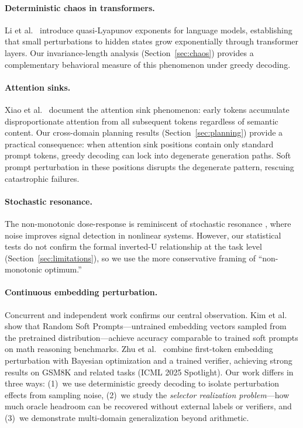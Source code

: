 \documentclass{article}
\begin{document}
\paragraph{Deterministic chaos in transformers.}
Li et al.~\cite{li2025} introduce quasi-Lyapunov exponents for
language models, establishing that small perturbations to hidden states
grow exponentially through transformer layers. Our invariance-length
analysis (Section~\ref{sec:chaos}) provides a complementary behavioral
measure of this phenomenon under greedy decoding.

\paragraph{Attention sinks.}
Xiao et al.~\cite{xiao2024} document the attention sink phenomenon:
early tokens accumulate disproportionate attention from all subsequent
tokens regardless of semantic content. Our cross-domain planning
results (Section~\ref{sec:planning}) provide a practical consequence:
when attention sink positions contain only standard prompt tokens,
greedy decoding can lock into degenerate generation paths. Soft prompt
perturbation in these positions disrupts the degenerate pattern,
rescuing catastrophic failures.

\paragraph{Stochastic resonance.}
The non-monotonic dose-response is reminiscent of stochastic resonance
\cite{gammaitoni1998}, where noise improves signal detection in nonlinear
systems. However, our statistical tests do not confirm the formal
inverted-U relationship at the task level (Section~\ref{sec:limitations}),
so we use the more conservative framing of ``non-monotonic optimum.''

\paragraph{Continuous embedding perturbation.}
Concurrent and independent work confirms our central observation.
Kim et al.~\cite{kim2026rsp} show that Random Soft Prompts---untrained
embedding vectors sampled from the pretrained distribution---achieve
accuracy comparable to trained soft prompts on math reasoning benchmarks.
Zhu et al.~\cite{zhu2025softreasoning} combine first-token embedding
perturbation with Bayesian optimization and a trained verifier, achieving
strong results on GSM8K and related tasks (ICML 2025 Spotlight). Our work
differs in three ways: (1)~we use deterministic greedy decoding to isolate
perturbation effects from sampling noise, (2)~we study the
\emph{selector realization problem}---how much oracle headroom can be
recovered without external labels or verifiers, and (3)~we demonstrate
multi-domain generalization beyond arithmetic.
\end{document}
